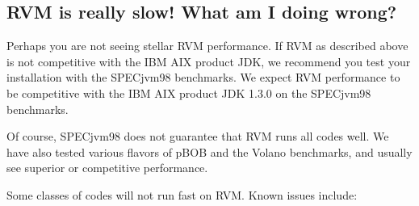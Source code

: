\subsection{RVM is really slow! What am I doing wrong?}

Perhaps you are not seeing stellar RVM performance.  If RVM as described
above is not competitive with the IBM AIX product JDK, we recommend
you test your installation with the SPECjvm98 benchmarks.
We expect RVM performance to be competitive with the 
IBM AIX product JDK 1.3.0 on the SPECjvm98 benchmarks. 

Of course, SPECjvm98 does not guarantee that RVM runs all codes
well.  We have also tested various flavors of pBOB and the Volano
benchmarks, and usually see superior or competitive performance.

Some classes of codes will not run fast on RVM.  Known issues include:
